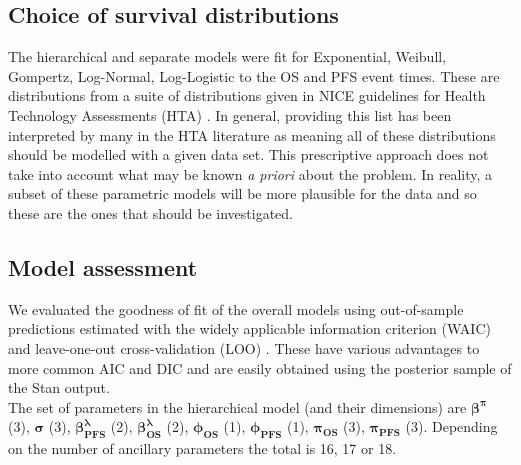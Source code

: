 \documentclass[AMA,STIX1COL]{WileyNJD-v2}
\begin{document}
%
\subsection{Choice of survival distributions}
The hierarchical and separate models were fit for Exponential, Weibull, Gompertz, Log-Normal, Log-Logistic to the OS and PFS event times.
These are distributions from a suite of distributions given in NICE guidelines for Health Technology Assessments (HTA) \cite{Latimer2011}.
In general, providing this list has been interpreted by many in the HTA literature as meaning all of these distributions should be modelled with a given data set.
This prescriptive approach does not take into account what may be known {\it a priori} about the problem.
In reality, a subset of these parametric models will be more plausible for the data and so these are the ones that should be investigated.

%
\subsection{Model assessment}
We evaluated the goodness of fit of the overall models using out-of-sample predictions estimated with the widely applicable information criterion (WAIC) and leave-one-out cross-validation (LOO) \cite{Vehtari2017}.
These have various advantages to more common AIC and DIC and are easily obtained using the posterior sample of the Stan output.\\
The set of parameters in the hierarchical model (and their dimensions) are
$\mathbf{\beta^{\pi}}$ (3), $\mathbf{\sigma}$ (3), $\mathbf{\beta^{\lambda}_{PFS}}$ (2), $\mathbf{\beta^{\lambda}_{OS}}$ (2), $\mathbf{\phi_{OS}}$ (1), $\mathbf{\phi_{PFS}}$ (1), $\mathbf{\pi_{OS}}$ (3), $\mathbf{\pi_{PFS}}$ (3).
Depending on the number of ancillary parameters the total is 16, 17 or 18.


\end{document}

